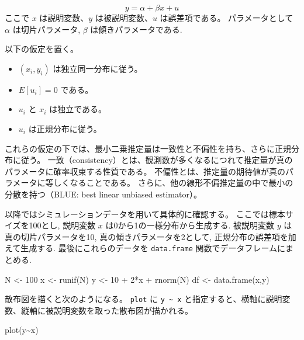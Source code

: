 \documentclass[
  letterpaper,
  xelatex,
  ja=standard, xelatex]{bxjsbook}
\newenvironment{Shaded}{\begin{snugshade}}{\end{snugshade}}
\newcommand{\DecValTok}[1]{\textcolor[rgb]{0.68,0.00,0.00}{#1}}
\newcommand{\FunctionTok}[1]{\textcolor[rgb]{0.28,0.35,0.67}{#1}}
\newcommand{\NormalTok}[1]{\textcolor[rgb]{0.00,0.23,0.31}{#1}}
\newcommand{\OtherTok}[1]{\textcolor[rgb]{0.00,0.23,0.31}{#1}}
\newcommand{\SpecialCharTok}[1]{\textcolor[rgb]{0.37,0.37,0.37}{#1}}
\providecommand{\tightlist}{%
  \setlength{\itemsep}{0pt}\setlength{\parskip}{0pt}}\usepackage{longtable,booktabs,array}
\begin{document}
\[
y = \alpha + \beta x + u
\] ここで \(x\) は説明変数、\(y\) は被説明変数、\(u\) は誤差項である。
パラメータとして \(\alpha\) は切片パラメータ, \(\beta\)
は傾きパラメータである.

以下の仮定を置く。

\begin{itemize}
\tightlist
\item
  \((x_i, y_i)\) は独立同一分布に従う。
\item
  \(E[u_i] = 0\) である。
\item
  \(u_i\) と \(x_i\) は独立である。
\item
  \(u_i\) は正規分布に従う。
\end{itemize}

これらの仮定の下では、最小二乗推定量は一致性と不偏性を持ち、さらに正規分布に従う。
一致（consistency）とは、観測数が多くなるにつれて推定量が真のパラメータに確率収束する性質である。
不偏性とは、推定量の期待値が真のパラメータに等しくなることである。
さらに、他の線形不偏推定量の中で最小の分散を持つ（BLUE: best linear
unbiased estimator）。

以降ではシミュレーションデータを用いて具体的に確認する。
ここでは標本サイズを100とし, 説明変数 \(x\)
は0から1の一様分布から生成する. 被説明変数 \(y\)
は真の切片パラメータを10, 真の傾きパラメータを2として,
正規分布の誤差項を加えて生成する. 最後にこれらのデータを
\texttt{data.frame} 関数でデータフレームにまとめる.

\begin{Shaded}
\begin{Highlighting}[]
\NormalTok{N }\OtherTok{\textless{}{-}} \DecValTok{100}
\NormalTok{x }\OtherTok{\textless{}{-}} \FunctionTok{runif}\NormalTok{(N)}
\NormalTok{y }\OtherTok{\textless{}{-}} \DecValTok{10} \SpecialCharTok{+} \DecValTok{2}\SpecialCharTok{*}\NormalTok{x }\SpecialCharTok{+} \FunctionTok{rnorm}\NormalTok{(N)}
\NormalTok{df }\OtherTok{\textless{}{-}} \FunctionTok{data.frame}\NormalTok{(x,y)}
\end{Highlighting}
\end{Shaded}

散布図を描くと次のようになる。 \texttt{plot} に
\texttt{y\ \textasciitilde{}\ x}
と指定すると、横軸に説明変数、縦軸に被説明変数を取った散布図が描かれる。

\begin{Shaded}
\begin{Highlighting}[]
\FunctionTok{plot}\NormalTok{(y}\SpecialCharTok{\textasciitilde{}}\NormalTok{x)}
\end{Highlighting}
\end{Shaded}
\end{document}
